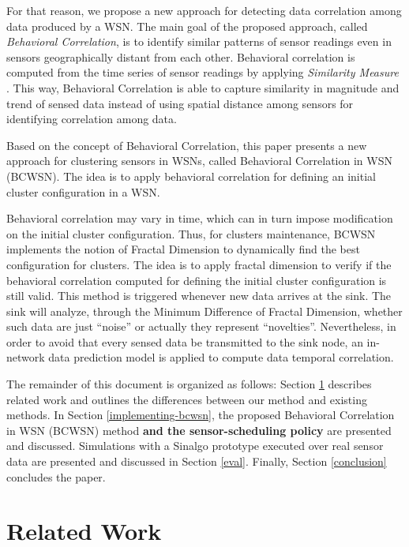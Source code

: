 \documentclass{acm_proc_article-sp}
\begin{document}
For that reason, we propose a new approach for detecting data correlation among
data produced by a WSN. The main goal of the proposed approach, called  {\it
Behavioral Correlation}, is to identify similar patterns of sensor readings
even in sensors geographically distant from each other. Behavioral correlation
is computed from the time series of sensor readings by applying {\it
Similarity Measure} \cite{Liu2007}. This way, Behavioral Correlation is able to
capture similarity in magnitude and trend of sensed data instead of using
spatial distance among sensors for identifying correlation among data.
\vspace*{-.3cm}

Based on the concept of Behavioral Correlation, this paper presents a new
approach for clustering sensors in WSNs, called Behavioral Correlation in WSN
(BCWSN). The idea is to apply behavioral correlation for defining an initial
cluster configuration in a WSN.
\vspace*{-.3cm}

Behavioral correlation may vary in time, which can in turn impose modification
on the initial cluster configuration. Thus, for clusters maintenance, BCWSN
implements the notion of Fractal Dimension to dynamically find the best
configuration for clusters. The idea is to apply fractal dimension to verify if
the behavioral correlation computed for defining the initial cluster
configuration is still valid. This method is triggered whenever new data arrives
at the sink.
The sink will analyze, through the Minimum Difference of Fractal Dimension,
whether such data are just ``noise'' or actually they represent ``novelties''. 
Nevertheless, in order to avoid that every sensed data be transmitted to the
sink node, an in-network data prediction model is applied to compute data
temporal correlation.
\vspace*{-.3cm}

The remainder of this document is organized as follows: Section
\ref{related-work} describes related work and outlines the differences between
our method and existing methods. In Section \ref{implementing-bcwsn}, the
proposed Behavioral Correlation in WSN (BCWSN) method {\bf and the sensor-scheduling
policy} are presented and discussed. Simulations with a Sinalgo
\cite{Sinalgo2007} prototype executed over real sensor data are presented and
discussed in Section \ref{eval}. Finally, Section \ref{conclusion} concludes the
paper.


\section{Related Work}
\label{related-work}
\end{document}
